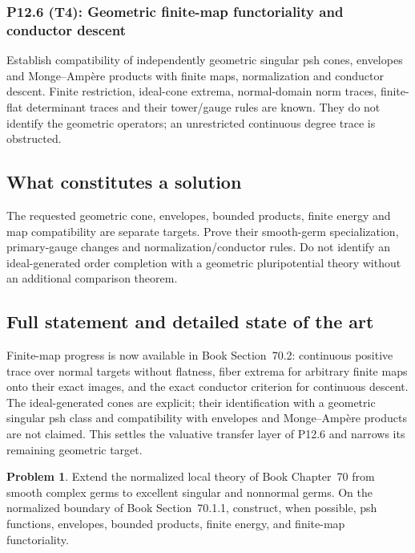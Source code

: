 \documentclass[11pt,a4paper]{article}
\theoremstyle{definition}
\newtheorem{problem}{Problem}[section]
\theoremstyle{remark}
\begin{document}
\subsubsection*{P12.6 (T4): Geometric finite-map functoriality and conductor descent}
\label{atom:P12.6}
Establish compatibility of independently geometric singular psh cones, envelopes and Monge--Ampère products with finite maps, normalization and conductor descent. Finite restriction, ideal-cone extrema, normal-domain norm traces, finite-flat determinant traces and their tower/gauge rules are known. They do not identify the geometric operators; an unrestricted continuous degree trace is obstructed.

\subsection{What constitutes a solution}
The requested geometric cone, envelopes, bounded products, finite energy and map compatibility are separate targets. Prove their smooth-germ specialization, primary-gauge changes and normalization/conductor rules. Do not identify an ideal-generated order completion with a geometric pluripotential theory without an additional comparison theorem.

\subsection{Full statement and detailed state of the art}
\label{sec:ch72-singular-local}

Finite-map progress is now available in Book Section~70.2:
continuous positive trace over normal targets without flatness, fiber
extrema for arbitrary finite maps onto their exact images, and the exact
conductor criterion for continuous descent. The ideal-generated cones
are explicit; their identification with a geometric singular psh class
and compatibility with envelopes and Monge--Amp\`ere products are not
claimed. This settles the valuative transfer layer of P12.6 and narrows
its remaining geometric target.

\begin{problem}\label{prob:frontier-singular-local}
Extend the normalized local theory of
Book Chapter~70 from smooth complex germs to excellent
singular and nonnormal germs. On the normalized boundary of
Book Section~70.1.1, construct, when possible,
psh functions, envelopes, bounded products, finite energy, and finite-map
functoriality.
\end{problem}
\end{document}
